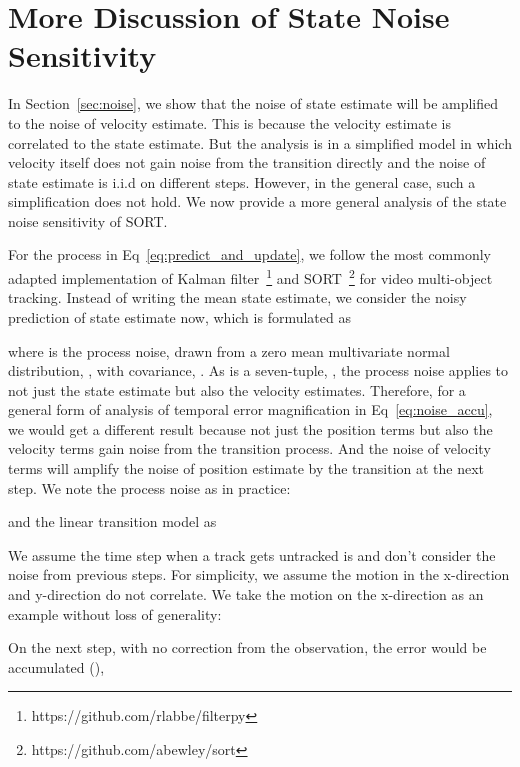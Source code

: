 \documentclass[10pt,twocolumn,letterpaper]{article}
\begin{document}
\section{More Discussion of State Noise Sensitivity}
\label{sec:more_discuss_state_noise}
In Section~\ref{sec:noise}, we show that the noise of state estimate will be amplified to the noise of velocity estimate. This is because the velocity estimate is correlated to the state estimate. But the analysis is in a simplified model in which velocity itself does not gain noise from the transition directly and the noise of state estimate is i.i.d on different steps. However, in the general case, such a simplification does not hold. We now provide a more general analysis of the state noise sensitivity of SORT.

For the process in Eq~\ref{eq:predict_and_update}, we follow the most commonly adapted implementation of Kalman filter~\footnote{https://github.com/rlabbe/filterpy} and SORT~\footnote{https://github.com/abewley/sort} for video multi-object tracking. Instead of writing the mean state estimate, we consider the noisy prediction of state estimate now, which is formulated as 

where  is the process noise, drawn from a zero mean multivariate normal distribution, , with covariance, . 
As  is a seven-tuple, \ie , the process noise applies to not just the state estimate but also the velocity estimates. Therefore, for a general form of analysis of temporal error magnification in Eq~\ref{eq:noise_accu}, we would get a different result because not just the position terms but also the velocity terms gain noise from the transition process. And the noise of velocity terms will amplify the noise of position estimate by the transition at the next step. We note the process noise as in practice:

and the linear transition model as


We assume the time step when a track gets untracked is  and don't consider the noise from previous steps. For simplicity, we assume the motion in the x-direction and y-direction do not correlate. We take the motion on the x-direction as an example without loss of generality: 


On the next step, with no correction from the observation, the error would be accumulated (),
\end{document}
